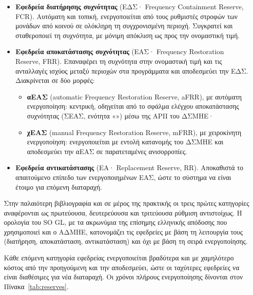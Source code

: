 \begin{itemize}
\item \textbf{Εφεδρεία διατήρησης συχνότητας} (ΕΔΣ· Frequency Containment Reserve, FCR).
      Αυτόματη και τοπική, ενεργοποιείται από τους ρυθμιστές στροφών των μονάδων από κοινού σε
      ολόκληρη τη συγχρονισμένη περιοχή. Συγκρατεί και σταθεροποιεί τη συχνότητα, με μόνιμη
      απόκλιση ως προς την ονομαστική τιμή.
\item \textbf{Εφεδρεία αποκατάστασης συχνότητας} (ΕΑΣ· Frequency Restoration Reserve, FRR).
      Επαναφέρει τη συχνότητα στην ονομαστική τιμή και τις ανταλλαγές ισχύος μεταξύ περιοχών
      στα προγράμματα και αποδεσμεύει την ΕΔΣ. Διακρίνεται σε δύο μορφές:
      \begin{itemize}
      \item \textbf{αΕΑΣ} (automatic Frequency Restoration Reserve, aFRR), με αυτόματη ενεργοποίηση: κεντρική, οδηγείται από το σφάλμα
            ελέγχου αποκατάστασης συχνότητας (ΣΕΑΣ, ενότητα «») μέσω της ΑΡΠ του
            ΔΣΜΗΕ·
      \item \textbf{χΕΑΣ} (manual Frequency Restoration Reserve, mFRR), με χειροκίνητη ενεργοποίηση: ενεργοποιείται με εντολή
            κατανομής του ΔΣΜΗΕ και αποδεσμεύει την αΕΑΣ σε παρατεταμένες ανισορροπίες.
      \end{itemize}
\item \textbf{Εφεδρεία αντικατάστασης} (ΕΑ· Replacement Reserve, RR). Αποκαθιστά το απαιτούμενο
      επίπεδο των ενεργοποιημένων ΕΑΣ, ώστε το σύστημα να είναι έτοιμο για επόμενη διαταραχή.
\end{itemize}

Στην παλαιότερη βιβλιογραφία και σε μέρος της πρακτικής οι τρεις πρώτες κατηγορίες
αναφέρονται ως πρωτεύουσα, δευτερεύουσα και τριτεύουσα ρύθμιση αντιστοίχως. Η ορολογία του
SO GL, με τα ακρωνύμια της επίσημης ελληνικής απόδοσης που χρησιμοποιεί και ο ΑΔΜΗΕ,
κατονομάζει τις εφεδρείες με βάση τη λειτουργία τους (διατήρηση, αποκατάσταση,
αντικατάσταση) και όχι με βάση τη σειρά ενεργοποίησης.

Κάθε επόμενη κατηγορία εφεδρείας ενεργοποιείται βραδύτερα και με χαμηλότερο κόστος από την
προηγούμενη και την αποδεσμεύει, ώστε οι ταχύτερες εφεδρείες να είναι διαθέσιμες για νέα
διαταραχή. Οι χρόνοι πλήρους ενεργοποίησης δίνονται στον Πίνακα~\ref{tab:reserves}.

